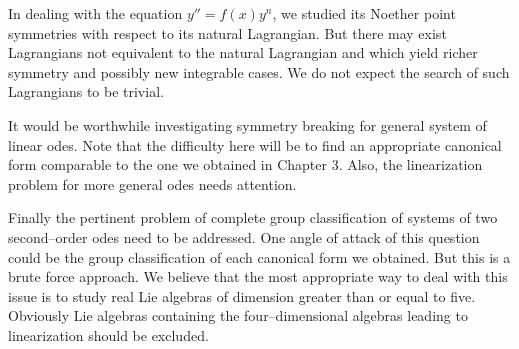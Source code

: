 In dealing with the equation $y''=f(x)y^n$, we studied its Noether point
symmetries with respect to its natural Lagrangian. But there may exist
Lagrangians not equivalent to the natural Lagrangian and  which yield richer
symmetry and possibly new integrable cases. We do not expect the search of
such Lagrangians to be trivial.

It would be worthwhile investigating symmetry breaking for general  system of
linear odes. Note that the difficulty here will be to find an appropriate
canonical form comparable to the one we obtained in Chapter 3. Also, the
linearization problem for more general odes needs attention.

Finally  the pertinent problem of complete group classification of systems of two second--order
odes need to be addressed. One angle of attack of this question could be the
group classification of each canonical form we obtained. But this is a brute
force approach. We believe that the most appropriate way to deal with this
issue  is to study real Lie algebras of dimension greater than or equal to
five. Obviously Lie algebras containing  the four--dimensional algebras
leading to linearization should be excluded.


%
